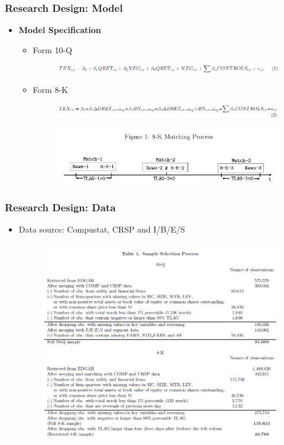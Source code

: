 \documentclass{beamer}
\begin{document}
\begin{frame}
	\frametitle{Research Design: Model}
	\begin{itemize}

\item \textbf{Model Specification}
	\begin{itemize}
		\item Form 10-Q
		
		\begin{figure}[h]
			\centering
			\includegraphics[width=0.75\linewidth]{eq1}
			\label{eq1}
		\end{figure}
	
		\item Form 8-K
		
		\begin{figure}[h]
			\centering
			\includegraphics[width=0.8\linewidth]{eq2}
			\label{eq2}
		\end{figure}
	
		\begin{figure}[h]
			\centering
			\includegraphics[width=0.6\linewidth]{fig1}
			\label{fig1}
		\end{figure}
	\end{itemize}

\end{itemize}
\end{frame}
\begin{frame}
\frametitle{Research Design: Data}

\begin{itemize}
	\item Data source: Compustat, CRSP and I/B/E/S
	
	\begin{figure}[h]
		\centering
		\includegraphics[width=0.7\linewidth]{tab1}
		\label{tab1}
	\end{figure}

\end{itemize}
\end{frame}
\end{document}
